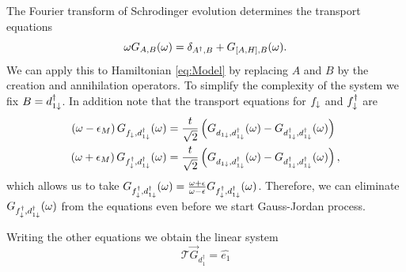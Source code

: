 \documentclass[showpacs,aps,prb,reprint,superscriptaddress]{revtex4-1}
\begin{document}
The Fourier transform of Schrodinger evolution determines the transport equations 
\begin{equation}
    \omega G_{A,B}(\omega)=\delta_{A^{\dagger},B}+G_{\left[A,H\right],B}(\omega).
    \label{eq:Transport}
\end{equation}
\noindent We can apply this to Hamiltonian \eqref{eq:Model} by replacing $A$ and $B$ by the creation and annihilation operators. To simplify the complexity of the system we fix $B = d^\dagger_{1\downarrow}$. In addition note that the transport equations for $f_\downarrow$ and $f^\dagger_\downarrow$ are 
\begin{align}
        \left(\omega-\epsilon_{M}\right)G_{f_{\downarrow},d_{1\downarrow}^{\dagger}}(\omega)&=\frac{t}{\sqrt{2}}\left(G_{d_{1\downarrow},d_{1\downarrow}^{\dagger}}(\omega)-G_{d_{1\downarrow}^{\dagger},d_{1\downarrow}^{\dagger}}(\omega)\right) \\
    \left(\omega+\epsilon_{M}\right)G_{f_{\downarrow}^{\dagger},d_{1\downarrow}^{\dagger}}(\omega)&=\frac{t}{\sqrt{2}}\left(G_{d_{1\downarrow},d_{1\downarrow}^{\dagger}}(\omega)-G_{d_{1\downarrow}^{\dagger},d_{1\downarrow}^{\dagger}}(\omega)\right),
\end{align}
\noindent which allows us to take $G_{f_{\downarrow}^{\dagger},d_{1\downarrow}^{\dagger}}(\omega) = \frac{\omega + \epsilon}{\omega -\epsilon}G_{f_{\downarrow}^{\dagger},d_{1\downarrow}^{\dagger}}(\omega) $. Therefore, we can eliminate $G_{f_{\downarrow}^{\dagger},d_{1\downarrow}^{\dagger}}(\omega) $ from the equations even before we start Gauss-Jordan process.

Writing the other equations  we obtain the  linear system
\begin{equation}
    \mathcal{T} \vec{G}_{d^\dagger_1} = \hat{e_1}
\end{equation}
\end{document}
